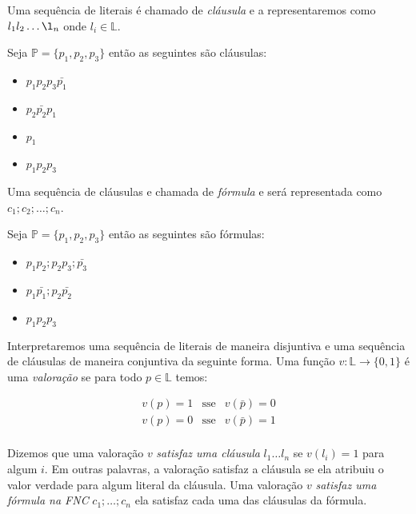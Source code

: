 Uma sequência de literais é chamado de {\em cláusula} e a representaremos como $l_1l_2\dots\l_n$ onde $l_i \in \mathbb{L}$.


\begin{example}
  Seja $\mathbb{P} = \{p_1, p_2, p_3\}$ então as seguintes são cláusulas:
\begin{itemize}
\item[] $p_1p_2p_3\bar{p_1}$
\item[] $p_2\bar{p_2}p_1$
\item[] $p_1$
\item[] $p_1p_2p_3$
\end{itemize}
\end{example}

Uma sequência de cláusulas e chamada de {\em fórmula} e será representada como $c_1;c_2;\dots;c_n$.

\begin{example}
  Seja $\mathbb{P} = \{p_1, p_2, p_3\}$ então as seguintes são fórmulas:
\begin{itemize}
\item[] $p_1p_2;p_2p_3;\bar{p_3}$
\item[] $p_1\bar{p_1};p_2\bar{p_2}$
\item[] $p_1p_2p_3$
\end{itemize}
\end{example}

Interpretaremos uma sequência de literais de maneira disjuntiva e uma sequência de cláusulas de maneira conjuntiva da seguinte forma.
Uma função $v: \mathbb{L} \to \{0,1\}$ é uma {\em valoração} se para todo $p \in \mathbb{L}$ temos:

\begin{eqnarray*}
  v(p) = 1 & \textrm{sse} & v(\bar{p}) = 0\\
  v(p) = 0 & \textrm{sse} & v(\bar{p}) = 1\\
\end{eqnarray*}

Dizemos que uma valoração $v$ {\em satisfaz uma cláusula} $l_1 \dots l_n$ se $v(l_i) = 1$ para algum $i$.
Em outras palavras, a valoração satisfaz a cláusula se ela atribuiu o valor verdade para algum literal da cláusula.
Uma valoração $v$ {\em satisfaz uma fórmula na FNC} $c_1; \dots; c_n$ ela satisfaz cada uma das cláusulas da fórmula.


